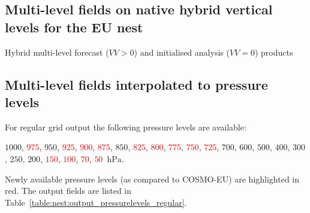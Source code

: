 \subsection{Multi-level fields on native hybrid vertical levels for the EU nest}

\renewcommand{\onlyglb}[1]{}
\renewcommand{\onlyloc}[1]{#1}
%
\begin{vartable}{\caption{Hybrid multi-level forecast ($VV>0$) and initialised analysis ($VV=0$) products}}
  
  
  
\end{vartable}


\subsection{Multi-level fields interpolated to pressure levels}

\renewcommand{\new}[1]{\textcolor{red}{#1}}
%
%
\renewcommand{\pressurelevelsRegular}{$1000$, \new{$975$}, $950$, \new{$925$}, \new{$900$}, 
                                    \new{$875$}, $850$, \new{$825$}, \new{$800$}, 
                                    \new{$775$}, \new{$750$}, \new{$725$}, $700$, $600$, 
                                    $500$, $400$, $300$, $250$, $200$, \new{$150$}, \new{$100$}, 
                                    \new{$70$}, \new{$50$}~$\mathrm{hPa}$}

For regular grid output the following pressure levels are available: 
\begin{center}
\begin{minipage}{0.5\linewidth}
\pressurelevelsRegular. 
\end{minipage}
\end{center}

Newly available pressure levels (as compared to COSMO-EU) are highlighted in red. 
The output fields are listed in Table~\ref{table:nest:output_pressurelevels_regular}.

